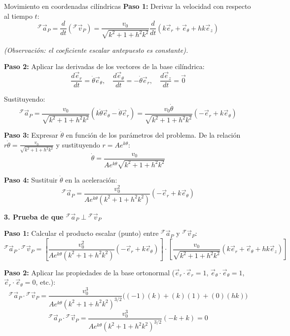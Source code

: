 \begin{solucion}{Movimiento en coordenadas cilíndricas}
\textbf{Paso 1:} Derivar la velocidad con respecto al tiempo $t$:
\[
{}^{\mathcal{F}}\vec{a}_{P} = \frac{d}{dt}\left({}^{\mathcal{F}}\vec{v}_{P}\right) = \frac{v_0}{\sqrt{k^2 + 1 + h^2 k^2}} \frac{d}{dt}\left( k \vec{e}_r + \vec{e}_\theta + h k \vec{e}_z \right)
\]

\textit{(Observación: el coeficiente escalar antepuesto es constante).}

\textbf{Paso 2:} Aplicar las derivadas de los vectores de la base cilíndrica:
\[
\frac{d\vec{e}_r}{dt} = \dot{\theta}\vec{e}_\theta, \quad \frac{d\vec{e}_\theta}{dt} = -\dot{\theta}\vec{e}_r, \quad \frac{d\vec{e}_z}{dt} = \vec{0}
\]

Sustituyendo:
\[
{}^{\mathcal{F}}\vec{a}_{P} = \frac{v_0}{\sqrt{k^2 + 1 + h^2 k^2}} \left( k \dot{\theta}\vec{e}_\theta - \dot{\theta}\vec{e}_r \right) = \frac{v_0 \dot{\theta}}{\sqrt{k^2 + 1 + h^2 k^2}} \left( -\vec{e}_r + k \vec{e}_\theta \right)
\]

\textbf{Paso 3:} Expresar $\dot{\theta}$ en función de los parámetros del problema. De la relación $r \dot{\theta} = \frac{v_0}{\sqrt{k^2 + 1 + h^2 k^2}}$ y sustituyendo $r = A e^{k\theta}$:
\[
\dot{\theta} = \frac{v_0}{A e^{k\theta} \sqrt{k^2 + 1 + h^2 k^2}}
\]

\textbf{Paso 4:} Sustituir $\dot{\theta}$ en la aceleración:
\[
{}^{\mathcal{F}}\vec{a}_{P} = \frac{v_0^2}{A e^{k\theta} (k^2 + 1 + h^2 k^2)} \left( -\vec{e}_r + k \vec{e}_\theta \right)
\]

\vspace{0.5cm}

\noindent\textbf{3. Prueba de que ${}^{\mathcal{F}}\vec{a}_{P} \perp {}^{\mathcal{F}}\vec{v}_{P}$}

\textbf{Paso 1:} Calcular el producto escalar (punto) entre ${}^{\mathcal{F}}\vec{a}_{P}$ y ${}^{\mathcal{F}}\vec{v}_{P}$:
\[
{}^{\mathcal{F}}\vec{a}_{P} \cdot {}^{\mathcal{F}}\vec{v}_{P} = \left[ \frac{v_0^2}{A e^{k\theta} (k^2 + 1 + h^2 k^2)} \left( -\vec{e}_r + k \vec{e}_\theta \right) \right] \cdot \left[ \frac{v_0}{\sqrt{k^2 + 1 + h^2 k^2}} \left( k \vec{e}_r + \vec{e}_\theta + h k \vec{e}_z \right) \right]
\]

\textbf{Paso 2:} Aplicar las propiedades de la base ortonormal ($\vec{e}_r \cdot \vec{e}_r = 1$, $\vec{e}_\theta \cdot \vec{e}_\theta = 1$, $\vec{e}_r \cdot \vec{e}_\theta = 0$, etc.):
\[
{}^{\mathcal{F}}\vec{a}_{P} \cdot {}^{\mathcal{F}}\vec{v}_{P} = \frac{v_0^3}{A e^{k\theta} (k^2 + 1 + h^2 k^2)^{3/2}} \Big( (-1)(k) + (k)(1) + (0)(hk) \Big)
\]
\[
{}^{\mathcal{F}}\vec{a}_{P} \cdot {}^{\mathcal{F}}\vec{v}_{P} = \frac{v_0^3}{A e^{k\theta} (k^2 + 1 + h^2 k^2)^{3/2}} (-k + k) = 0
\]


\end{solucion}
